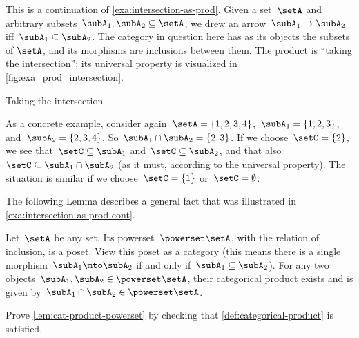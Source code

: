 \begin{example}
    \label{exa:intersection-as-prod-cont}
    This is a continuation of \cref{exa:intersection-as-prod}.
    Given a set~$\setA$ and arbitrary subsets~$\subA_1, \subA_2 \subseteq \setA$, we drew an arrow~$\subA_1 \to \subA_2$ iff~$\subA_1 \subseteq \subA_2$.
    The category in question here has as its objects the subsets of $\setA$, and its morphisms are inclusions between them.
    The product is ``taking the intersection''; its universal property is visualized in \cref{fig:exa_prod_intersection}.
    \begin{marginfigure}
        \centering
        \caption{Taking the intersection}
        \label{fig:exa_prod_intersection_cont}
    \end{marginfigure}
    As a concrete example, consider again~$\setA = \{ 1, 2, 3, 4 \}$,~$\subA_1 = \{ 1, 2, 3 \}$, and~$\subA_2 = \{2, 3, 4 \}$.
    So~$\subA_1 \cap \subA_2 = \{2, 3 \}$.
    If we choose~$\setC = \{ 2 \}$, we see that~$\setC \subseteq \subA_1$ and~$\setC \subseteq \subA_2$, and that also~$\setC \subseteq \subA_1 \cap \subA_2$ (as it must, according to the universal property).
    The situation is similar if we choose~$\setC = \{ 1\}$ or~$\setC = \emptyset$.
\end{example}

The following Lemma describes a general fact that was illustrated in \cref{exa:intersection-as-prod-cont}.
\begin{lemma}
    \label{lem:cat-product-powerset}
    Let~$\setA$ be any set.
    Its powerset~$\powerset \setA$, with the relation of inclusion, is a poset.
    View this poset as a category (this means there is a single morphism~$\subA_1 \mto \subA_2$ if and only if~$\subA_1 \subseteq \subA_2$).
    For any two objects~$\subA_1, \subA_2 \in \powerset \setA$, their categorical product exists and is given by~$\subA_1 \cap \subA_2 \in \powerset \setA$.
\end{lemma}

\begin{gradedexercise}
    \label{ex:CatProductPowerset}
    Prove \cref{lem:cat-product-powerset} by checking that \cref{def:categorical-product} is satisfied.
\end{gradedexercise}


